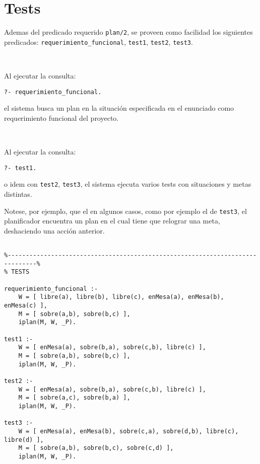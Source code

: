 \documentclass[a4paper,12pt]{report}
\begin{document}
\chapter{Tests}

Ademas del predicado requerido \texttt{plan/2}, se proveen como facilidad los 
siguientes predicados: \texttt{requerimiento\_funcional}, \texttt{test1}, 
\texttt{test2}, \texttt{test3}.

\ 

\noindent
Al ejecutar la consulta:

\begin{verbatim}
?- requerimiento_funcional.
\end{verbatim}

el sistema busca un plan en la situaci\'{o}n especificada en el enunciado como
requerimiento funcional del proyecto.

\ 

\noindent
Al ejecutar la consulta:

\begin{verbatim}
?- test1.
\end{verbatim}

o idem con \texttt{test2}, \texttt{test3}, el sistema ejecuta varios tests
con situaciones y metas distintas. 

Notese, por ejemplo, que el en algunos casos, como por ejemplo el de 
\texttt{test3}, el planificador encuentra un plan en el cual tiene que 
relograr una meta, deshaciendo una acci\'{o}n anterior. 

\begin{footnotesize}
\begin{verbatim}

%------------------------------------------------------------------------------%
% TESTS

requerimiento_funcional :- 
    W = [ libre(a), libre(b), libre(c), enMesa(a), enMesa(b), enMesa(c) ],
    M = [ sobre(a,b), sobre(b,c) ],
    iplan(M, W, _P).
    
test1 :-
    W = [ enMesa(a), sobre(b,a), sobre(c,b), libre(c) ],
    M = [ sobre(a,b), sobre(b,c) ],
    iplan(M, W, _P).

test2 :-
    W = [ enMesa(a), sobre(b,a), sobre(c,b), libre(c) ],
    M = [ sobre(a,c), sobre(b,a) ],
    iplan(M, W, _P).
    
test3 :-
    W = [ enMesa(a), enMesa(b), sobre(c,a), sobre(d,b), libre(c), libre(d) ],
    M = [ sobre(a,b), sobre(b,c), sobre(c,d) ],
    iplan(M, W, _P).

\end{verbatim}
\end{footnotesize}
\end{document}
